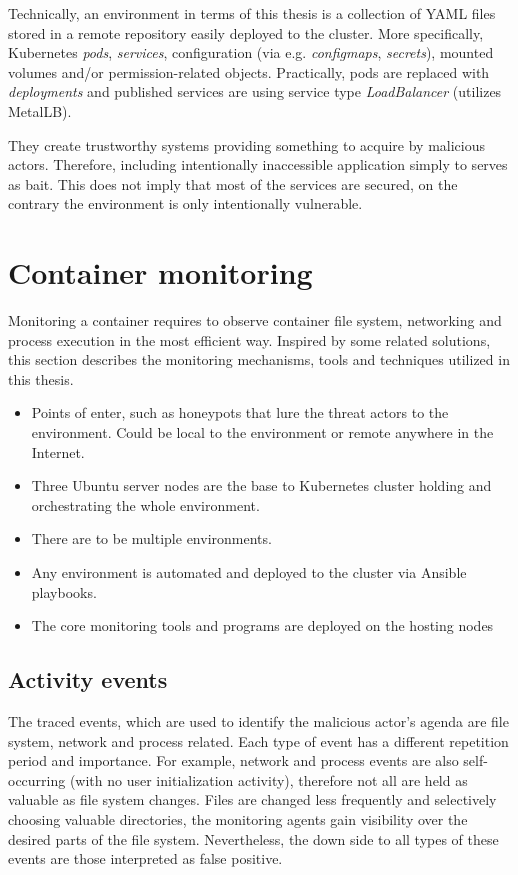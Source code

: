 Technically, an environment in terms of this thesis is a collection of YAML files stored in a remote repository easily deployed to the cluster. More specifically, Kubernetes \textit{pods}, \textit{services}, configuration (via e.g. \textit{configmaps}, \textit{secrets}), mounted volumes and/or permission-related objects. Practically, pods are replaced with \textit{deployments} and published services are using service type \textit{LoadBalancer} (utilizes MetalLB).

They create trustworthy systems providing something to acquire by malicious actors. Therefore, including intentionally inaccessible application simply to serves as bait. This does not imply that most of the services are secured, on the contrary the environment is only intentionally vulnerable.

\section{Container monitoring \label{design:con-mon}}
Monitoring a container requires to observe container file system, networking and process execution in the most efficient way. Inspired by some related solutions, this section describes the monitoring mechanisms, tools and techniques utilized in this thesis.

\begin{itemize}[noitemsep]
	\item 
	Points of enter, such as honeypots that lure the threat actors to the environment. Could be local to the environment or remote anywhere in the Internet.
	\item 
	Three Ubuntu server nodes are the base to Kubernetes cluster holding and orchestrating the whole environment.
	\item 
	There are to be multiple environments.
	\item
	Any environment is automated and deployed to the cluster via Ansible playbooks.
	\item 
	The core monitoring tools and programs are deployed on the hosting nodes
\end{itemize}

\subsection{Activity events \label{design:mon:events}}
The traced events, which are used to identify the malicious actor's agenda are file system, network and process related. Each type of event has a different repetition period and importance. For example, network and process events are also self-occurring (with no user initialization activity), therefore not all are held as valuable as file system changes. Files are changed less frequently and selectively choosing valuable directories, the monitoring agents gain visibility over the desired parts of the file system. Nevertheless, the down side to all types of these events are those interpreted as false positive.


